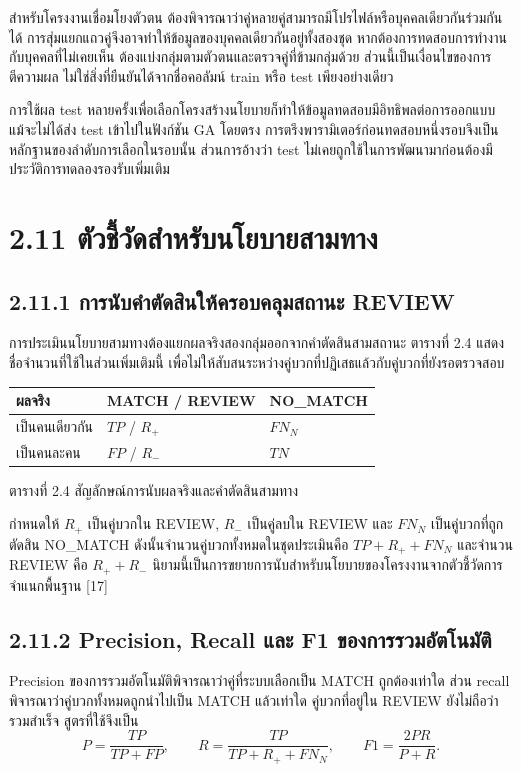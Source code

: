 สำหรับโครงงานเชื่อมโยงตัวตน ต้องพิจารณาว่าคู่หลายคู่สามารถมีโปรไฟล์หรือบุคคลเดียวกันร่วมกันได้ การสุ่มแยกแถวคู่จึงอาจทำให้ข้อมูลของบุคคลเดียวกันอยู่ทั้งสองชุด หากต้องการทดสอบการทำงานกับบุคคลที่ไม่เคยเห็น ต้องแบ่งกลุ่มตามตัวตนและตรวจคู่ที่ข้ามกลุ่มด้วย ส่วนนี้เป็นเงื่อนไขของการตีความผล ไม่ใช่สิ่งที่ยืนยันได้จากชื่อคอลัมน์ train หรือ test เพียงอย่างเดียว

การใช้ผล test หลายครั้งเพื่อเลือกโครงสร้างนโยบายก็ทำให้ข้อมูลทดสอบมีอิทธิพลต่อการออกแบบ แม้จะไม่ได้ส่ง test เข้าไปในฟังก์ชัน GA โดยตรง การตรึงพารามิเตอร์ก่อนทดสอบหนึ่งรอบจึงเป็นหลักฐานของลำดับการเลือกในรอบนั้น ส่วนการอ้างว่า test ไม่เคยถูกใช้ในการพัฒนามาก่อนต้องมีประวัติการทดลองรองรับเพิ่มเติม

\section*{2.11 ตัวชี้วัดสำหรับนโยบายสามทาง}
\subsection*{2.11.1 การนับคำตัดสินให้ครอบคลุมสถานะ REVIEW}
การประเมินนโยบายสามทางต้องแยกผลจริงสองกลุ่มออกจากคำตัดสินสามสถานะ ตารางที่ 2.4 แสดงชื่อจำนวนที่ใช้ในส่วนเพิ่มเติมนี้ เพื่อไม่ให้สับสนระหว่างคู่บวกที่ปฏิเสธแล้วกับคู่บวกที่ยังรอตรวจสอบ

\begin{center}\small
\begin{tabularx}{\linewidth}{p{3.2cm}XX}
\toprule
ผลจริง & MATCH / REVIEW & NO\_MATCH \\
\midrule
เป็นคนเดียวกัน & $TP$ / $R_+$ & $FN_N$ \\
เป็นคนละคน & $FP$ / $R_-$ & $TN$ \\
\bottomrule
\end{tabularx}
\par ตารางที่ 2.4 สัญลักษณ์การนับผลจริงและคำตัดสินสามทาง
\end{center}

กำหนดให้ $R_+$ เป็นคู่บวกใน REVIEW, $R_-$ เป็นคู่ลบใน REVIEW และ $FN_N$ เป็นคู่บวกที่ถูกตัดสิน NO\_MATCH ดังนั้นจำนวนคู่บวกทั้งหมดในชุดประเมินคือ $TP+R_++FN_N$ และจำนวน REVIEW คือ $R_++R_-$ นิยามนี้เป็นการขยายการนับสำหรับนโยบายของโครงงานจากตัวชี้วัดการจำแนกพื้นฐาน [17]

\subsection*{2.11.2 Precision, Recall และ F1 ของการรวมอัตโนมัติ}
Precision ของการรวมอัตโนมัติพิจารณาว่าคู่ที่ระบบเลือกเป็น MATCH ถูกต้องเท่าใด ส่วน recall พิจารณาว่าคู่บวกทั้งหมดถูกนำไปเป็น MATCH แล้วเท่าใด คู่บวกที่อยู่ใน REVIEW ยังไม่ถือว่ารวมสำเร็จ สูตรที่ใช้จึงเป็น
\begin{equation*}
P=\frac{TP}{TP+FP},\qquad
R=\frac{TP}{TP+R_++FN_N},\qquad
F1=\frac{2PR}{P+R}.
\end{equation*}

